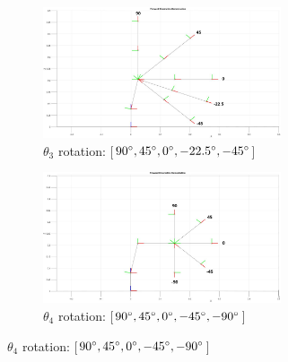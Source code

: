 \documentclass[9pt, a4paper]{article}
\begin{document}
\begin{figure}[h]
  \centering
  \begin{subfigure}{.5\textwidth}
    \centering
    \addtocounter{subfigure}{2}
    \includegraphics[width=7cm]{theta3.JPG}
    \caption{$\theta_3$ rotation: [$90\degree, 45\degree, 0\degree, -22.5\degree, -45\degree$]}
  \end{subfigure}%
  \begin{subfigure}{.5\textwidth}
    \centering
    \includegraphics[width=7cm]{theta4.JPG}
    \caption{$\theta_4$ rotation: [$90\degree, 45\degree, 0\degree, -45\degree, -90\degree$]}
  \end{subfigure}
\end{figure}
\end{document}
